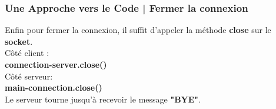 \documentclass[handout]{beamer}
\begin{document}
	\begin{frame}
	\frametitle{Une Approche vers le Code | Fermer la connexion}
	Enfin pour fermer la connexion, il suffit d'appeler la méthode {\bfseries close} sur 		le {\bfseries socket}.\newline \\
	Côté client :\newline \\
	{\bfseries connection-server.close()}\newline \\
	Côté serveur:\newline \\
	{\bfseries main-connection.close()}\newline \\
	Le serveur tourne jusqu'à recevoir le message {\bfseries "BYE"}.
	\end{frame}
	
\end{document}
